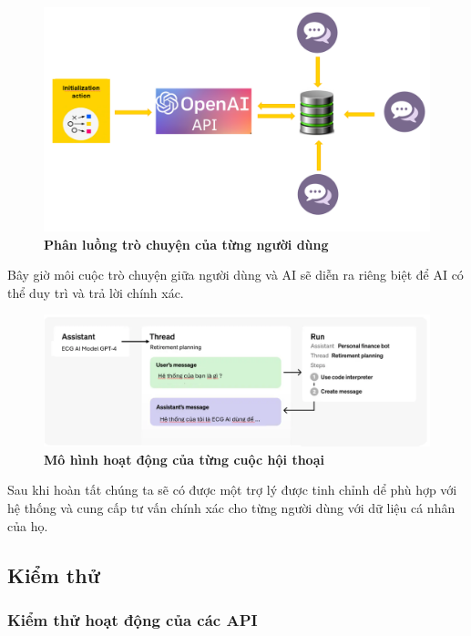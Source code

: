 \begin{figure}[H]
  \centering
  \includegraphics[scale=0.5]{Images/server/ai/tranning-ai-data.png}
  \caption[Phân luồng trò chuyện của từng người dùng]{\bfseries \fontsize{12pt}{0pt}
  \selectfont Phân luồng trò chuyện của từng người dùng}
  \label{thread-ai} %
\end{figure}

Bây giờ môi cuộc trò chuyện giữa người dùng và AI sẽ diễn ra riêng biệt để AI có thể duy trì và trả lời chính xác.
\begin{figure}[H]
  \centering
  \includegraphics[scale=0.7]{Images/server/ai/thread-message.png}
  \caption[Mô hình hoạt động của từng cuộc hội thoại]{\bfseries \fontsize{12pt}{0pt}
  \selectfont Mô hình hoạt động của từng cuộc hội thoại}
  \label{check-ai} %
\end{figure}

Sau khi hoàn tất chúng ta sẽ có được một trợ lý được tinh chỉnh dể phù hợp với hệ thống và cung cấp tư vấn chính xác cho từng người dùng với dữ liệu cá nhân của họ.

\subsection{Kiểm thử}

\subsubsection{Kiểm thử hoạt động của các API}


